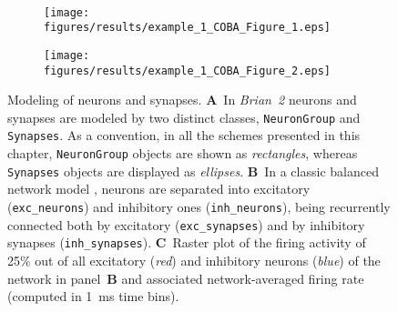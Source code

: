 \documentclass[a4paper, 11pt]{article}
\newcommand{\brian}{\emph{Brian~2}\xspace}
\begin{document}
\begin{figure}[!p]
\begin{subfigure}[t]{0.6\linewidth}
\end{subfigure}\\[1ex]
\begin{subfigure}[b]{.5\linewidth}
	\caption{}
	\texttt{[image: figures/results/example\_1\_COBA\_Figure\_1.eps]}
\end{subfigure}%
\begin{subfigure}[b]{.5\linewidth}
	\caption{}
	\texttt{[image: figures/results/example\_1\_COBA\_Figure\_2.eps]}
\end{subfigure}
\caption{Modeling of neurons and synapses.
\textbf{A}~In \brian neurons and synapses are modeled by two distinct classes, \lstinline|NeuronGroup| and \lstinline|Synapses|.
As a convention, in all the schemes presented in this chapter, \lstinline|NeuronGroup| objects are shown as \textit{rectangles}, whereas \lstinline|Synapses| objects are displayed as \textit{ellipses}.
\textbf{B}~In a classic balanced network model \citep{Brunel2000}, neurons are separated into excitatory (\lstinline|exc_neurons|) and inhibitory ones (\lstinline|inh_neurons|), being recurrently connected both by excitatory (\lstinline|exc_synapses|) and by inhibitory synapses (\lstinline|inh_synapses|).
\textbf{C}~Raster plot of the firing activity of 25\% out of all excitatory (\textit{red}) and inhibitory neurons (\textit{blue}) of the network in panel~\textbf{B} and associated network-averaged firing rate (computed in \SI{1}{\milli s} time bins).
}
\end{figure}
\end{document}
